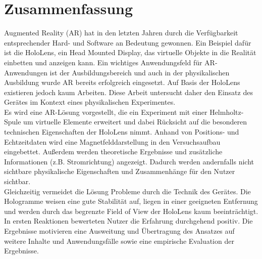 \section*{Zusammenfassung}
Augmented Reality (AR) hat in den letzten Jahren durch die Verfügbarkeit entsprechender Hard- und Software an Bedeutung gewonnen. Ein Beispiel dafür ist die HoloLens, ein Head Mounted Display, das virtuelle Objekte in die Realität einbetten und anzeigen kann. Ein wichtiges Anwendungsfeld für AR-Anwendungen ist der Ausbildungsbereich und auch in der physikalischen Ausbildung wurde AR bereits erfolgreich eingesetzt. Auf Basis der HoloLens existieren jedoch kaum Arbeiten. Diese Arbeit untersucht daher den Einsatz des Gerätes im Kontext eines physikalischen Experimentes.\\
\noindent\hspace*{5mm}
Es wird eine AR-Lösung vorgestellt, die ein Experiment mit einer Helmholtz-Spule um virtuelle Elemente erweitert und dabei Rücksicht auf die besonderen technischen Eigenschaften der HoloLens nimmt. Anhand von Positions- und Echtzeitdaten wird eine Magnetfelddarstellung in den Versuchsaufbau eingebettet. Außerdem werden theoretische Ergebnisse und zusätzliche Informationen (z.B. Stromrichtung) angezeigt. Dadurch werden andernfalls nicht sichtbare physikalische Eigenschaften und Zusammenhänge für den Nutzer sichtbar.\\
\noindent\hspace*{5mm}
Gleichzeitig vermeidet die Lösung Probleme durch die Technik des Gerätes. Die Hologramme weisen eine gute Stabilität auf, liegen in einer geeigneten Entfernung und werden durch das begrenzte Field of View der HoloLens kaum beeinträchtigt. In ersten Reaktionen bewerteten Nutzer die Erfahrung durchgehend positiv. Die Ergebnisse motivieren eine Ausweitung und Übertragung des Ansatzes auf weitere Inhalte und Anwendungsfälle sowie eine empirische Evaluation der Ergebnisse.

